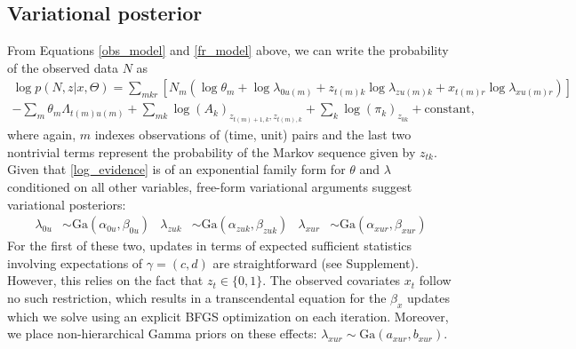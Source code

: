 \documentclass[10pt,letterpaper]{article}
\begin{document}
\subsection*{Variational posterior}
From Equations \ref{obs_model} and \ref{fr_model} above, we can write the probability of the observed data $N$ as
\begin{multline}
    \label{log_evidence}
    \log p(N, z|x, \Theta) = \sum_{mkr} \left[ 
        N_m \left( \log \theta_m +
            \log \lambda_{0u(m)} +
            z_{t(m) k} \log \lambda_{zu(m) k} + 
            x_{t(m) r} \log \lambda_{xu(m) r}
            \right)
    \right] \\
    - \sum_m \theta_m \Lambda_{t(m) u(m)} + 
    \sum_{mk} \log (A_k)_{z_{t(m)+1, k}, z_{t(m), k}} + 
    \sum_k \log (\pi_k)_{z_{0k}} + \text{constant,}
\end{multline}
where again, $m$ indexes observations of (time, unit) pairs and the last two nontrivial terms represent the probability of the Markov sequence given by $z_{tk}$. Given that \ref{log_evidence} is of an exponential family form for $\theta$ and $\lambda$ conditioned on all other variables, free-form variational arguments \cite{Wainwright2008-ii} suggest variational posteriors:
\begin{align}
    \lambda_{0u} &\sim \text{Ga}(\alpha_{0u}, \beta_{0u}) &
    \lambda_{zuk} &\sim \text{Ga}(\alpha_{zuk}, \beta_{zuk}) &
    \lambda_{xur} &\sim \text{Ga}(\alpha_{xur}, \beta_{xur})
\end{align}
For the first of these two, updates in terms of expected sufficient statistics involving expectations of $\gamma = (c, d)$ are straightforward (see Supplement). However, this relies on the fact that $z_t \in \lbrace0, 1\rbrace$. The observed covariates $x_t$ follow no such restriction, which results in a transcendental equation for the $\beta_x$ updates which we solve using an explicit BFGS optimization on each iteration. Moreover, we place non-hierarchical Gamma priors on these effects: $\lambda_{xur} \sim \text{Ga}(a_{xur}, b_{xur})$.
\end{document}
